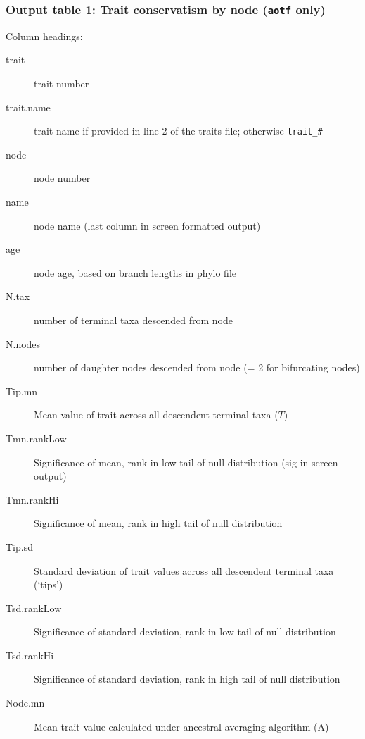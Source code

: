 \documentclass[12pt,letterpaper]{article}
\begin{document}
\subsubsection{Output table 1: Trait conservatism by node (\texttt{aotf} only)}

Column headings:

\begin{description}
\item[\hspace{1em} trait] trait number
\item[\hspace{1em} trait.name] trait name if provided in line 2 of the traits file;
  otherwise \verb|trait_#|
\item[\hspace{1em} node] node number
\item[\hspace{1em} name] node name (last column in screen formatted output)
\item[\hspace{1em} age] node age, based on branch lengths in phylo file
\item[\hspace{1em} N.tax] number of terminal taxa descended from node
\item[\hspace{1em} N.nodes] number of daughter nodes descended from node (= 2 for bifurcating nodes)
\item[\hspace{1em} Tip.mn] Mean value of trait across all descendent terminal taxa ($T$)
\item[\hspace{1em} Tmn.rankLow] Significance of mean, rank in low tail of null
  distribution (sig in screen output)
\item[\hspace{1em} Tmn.rankHi] Significance of mean, rank in high tail of null
  distribution
\item[\hspace{1em} Tip.sd] Standard deviation of trait values across all descendent terminal taxa (`tips')
\item[\hspace{1em} Tsd.rankLow] Significance of standard deviation, rank in low tail of null distribution
\item[\hspace{1em} Tsd.rankHi] Significance of standard deviation, rank in high tail of null distribution
\item[\hspace{1em} Node.mn] Mean trait value calculated under ancestral averaging algorithm (A)

\end{description}
\end{document}
